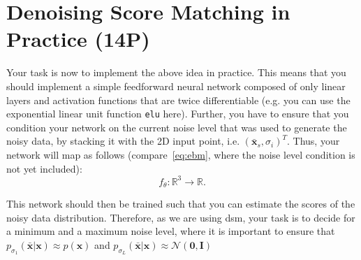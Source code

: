 \documentclass{article}
\newcommand{\R}{\mathbb{R}}
\renewcommand{\vec}[1]{\textbf{#1}}
\renewcommand{\vec}[1]{\textbf{#1}}
\begin{document}
\section{Denoising Score Matching in Practice (14P)}
Your task is now to implement the above idea in practice. This means that you should implement a simple feedforward neural network composed of only linear layers and activation functions that are twice differentiable (e.g. you can use the exponential linear unit function \texttt{elu} here). Further, you have to ensure that you condition your network on the current noise level that was used to generate the noisy data, by stacking it with the 2D input point, i.e. $(\bar{\vec x}_s, \sigma_i)^T$. 
Thus, your network will map as follows (compare~\eqref{eq:ebm}, where the noise level condition is not yet included): 
\[
f_\theta: \R^3 \to \R. 
\]


This network should then be trained such that you can estimate the scores of the noisy data distribution. Therefore, as we are using \gls{dsm}, your task is to decide for a minimum and a maximum noise level, where it is important to ensure that $p_{\sigma_{1}}(\bar{ \vec x}|\vec x)\approx p(\vec x)$ and $p_{\sigma_{L}}(\bar{ \vec x}|\vec x)\approx \mathcal{N}(\vec 0, \vec I)$ 
\end{document}
